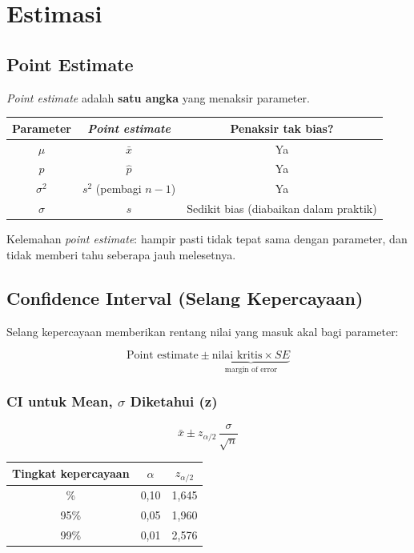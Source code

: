 \documentclass[
  indonesian,
  letterpaper,
]{book}
\newcounter{none} %
\begin{document}
\section{Estimasi}\label{estimasi}

\subsection{Point Estimate}\label{point-estimate}

\emph{Point estimate} adalah \textbf{satu angka} yang menaksir
parameter.

{\def\LTcaptype{none} %
\begin{longtable}[]{@{}ccc@{}}
\toprule\noalign{}
Parameter & \emph{Point estimate} & Penaksir tak bias? \\
\midrule\noalign{}
\endhead
\bottomrule\noalign{}
\endlastfoot
\(\mu\) & \(\bar{x}\) & Ya \\
\(p\) & \(\hat{p}\) & Ya \\
\(\sigma^2\) & \(s^2\) (pembagi \(n-1\)) & Ya \\
\(\sigma\) & \(s\) & Sedikit bias (diabaikan dalam praktik) \\
\end{longtable}
}

Kelemahan \emph{point estimate}: hampir pasti tidak tepat sama dengan
parameter, dan tidak memberi tahu seberapa jauh melesetnya.

\subsection{Confidence Interval (Selang
Kepercayaan)}\label{confidence-interval-selang-kepercayaan}

Selang kepercayaan memberikan rentang nilai yang masuk akal bagi
parameter:

\[
\text{Point estimate} \pm \underbrace{\text{nilai kritis} \times SE}_{\text{margin of error}}
\]

\subsubsection{\texorpdfstring{CI untuk Mean, \(\sigma\) Diketahui
(z)}{CI untuk Mean, \textbackslash sigma Diketahui (z)}}\label{ci-untuk-mean-sigma-diketahui-z}

\[
\bar{x} \pm z_{\alpha/2}\,\frac{\sigma}{\sqrt{n}}
\]

{\def\LTcaptype{none} %
\begin{longtable}[]{@{}ccc@{}}
\toprule\noalign{}
Tingkat kepercayaan & \(\alpha\) & \(z_{\alpha/2}\) \\
\midrule\noalign{}
\endhead
\bottomrule\noalign{}
\endlastfoot
90\% & 0,10 & 1,645 \\
95\% & 0,05 & 1,960 \\
99\% & 0,01 & 2,576 \\
\end{longtable}
}
\end{document}
